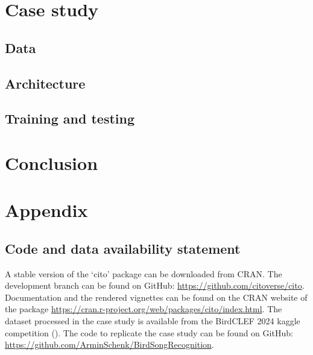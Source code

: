 \documentclass[12pt,twoside]{scrreport}
\newcommand{\pkg}[1]{`#1'}
\begin{document}
\chapter*{Case study}
\section*{Data}
\section*{Architecture}
\section*{Training and testing}

\chapter*{Conclusion}





\renewcommand{\bibname}{References}
 

\chapter*{Appendix}
\section*{Code and data availability statement}
A stable version of the \pkg{cito} package can be downloaded from CRAN. The development branch can be found on GitHub: \url{https://github.com/citoverse/cito}. Documentation and the rendered vignettes can be found on the CRAN website of the package \url{ https://cran.r-project.org/web/packages/cito/index.html}. The dataset processed in the case study is available from the BirdCLEF 2024 kaggle competition (\cite{birdclef-2024}). The code to replicate the case study can be found on GitHub: \url{https://github.com/ArminSchenk/BirdSongRecognition}.
\end{document}
